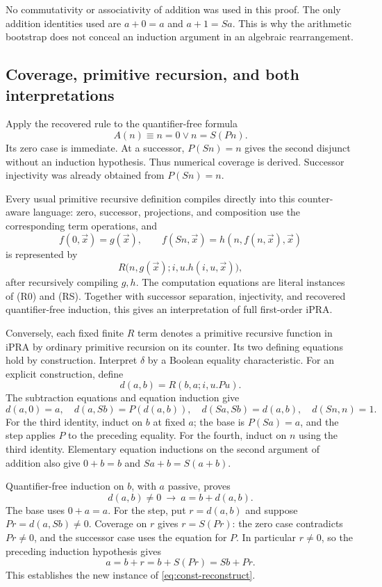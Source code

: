 No commutativity or associativity of addition was used in this proof.
The only addition identities used are $a+0=a$ and $a+1=Sa$.
This is why the arithmetic bootstrap does not conceal an induction
argument in an algebraic rearrangement.

\subsection{Coverage, primitive recursion, and both interpretations}

Apply the recovered rule to the quantifier-free formula
\[
                  A(n)\equiv n=0\lor n=S(Pn).
\]
Its zero case is immediate.  At a successor, $P(Sn)=n$ gives the second
disjunct without an induction hypothesis.  Thus numerical coverage is
derived.  Successor injectivity was already obtained from $P(Sn)=n$.

Every usual primitive recursive definition compiles directly into this
counter-aware language: zero, successor, projections, and composition use
the corresponding term operations, and
\[
 f(0,\vec x)=g(\vec x),\qquad
 f(Sn,\vec x)=h(n,f(n,\vec x),\vec x)
\]
is represented by
\[
 R\bigl(n,g(\vec x);i,u.h(i,u,\vec x)\bigr),
\]
after recursively compiling $g,h$.  The computation equations are
literal instances of \textup{(R0)} and \textup{(RS)}.  Together with
successor separation, injectivity, and recovered quantifier-free
induction, this gives an interpretation of full first-order iPRA.

Conversely, each fixed finite $R$ term denotes a primitive recursive
function in iPRA by ordinary primitive recursion on its counter.  Its
two defining equations hold by construction.  Interpret $\delta$ by a
Boolean equality characteristic.  For an explicit construction, define
\[
                         d(a,b)=R(b,a;i,u.Pu).
\]
The subtraction equations and equation induction give
\[
 d(a,0)=a,\quad d(a,Sb)=P(d(a,b)),\quad
 d(Sa,Sb)=d(a,b),\quad d(Sn,n)=1.
\]
For the third identity, induct on $b$ at fixed $a$; the base is
$P(Sa)=a$, and the step applies $P$ to the preceding equality.
For the fourth, induct on $n$ using the third identity.  Elementary
equation inductions on the second argument of addition also give
$0+b=b$ and $Sa+b=S(a+b)$.

Quantifier-free induction on $b$, with $a$ passive, proves
\[
           d(a,b)\ne0\ \longrightarrow\ a=b+d(a,b).
 \tag{Rec}\label{eq:const-reconstruct}
\]
The base uses $0+a=a$.  For the step, put $r=d(a,b)$ and suppose
$Pr=d(a,Sb)\ne0$.  Coverage on $r$ gives $r=S(Pr)$: the zero case
contradicts $Pr\ne0$, and the successor case uses the equation for $P$.
In particular $r\ne0$, so the preceding induction hypothesis gives
\[
              a=b+r=b+S(Pr)=Sb+Pr.
\]
This establishes the new instance of \eqref{eq:const-reconstruct}.


